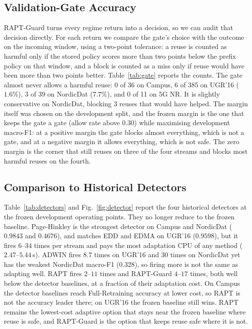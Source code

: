 \subsection{Validation-Gate Accuracy}
\label{sec:guard}
RAPT-Guard turns every regime return into a decision, so we can audit that decision
directly. For each return we compare the gate's choice with the outcome on the incoming
window, using a two-point tolerance: a reuse is counted as harmful only if the stored
policy scores more than two points below the prefix policy on that window, and a block is
counted as a miss only if reuse would have been more than two points better. Table~\ref{tab:gate}
reports the counts. The gate almost never allows a harmful reuse: 0 of 36 on Campus, 6 of
385 on UGR'16 ($1.6\%$), 3 of 39 on NordicDat ($7.7\%$), and 0 of 11 on 5G NR. It is
slightly conservative on NordicDat, blocking 3 reuses that would have helped. The margin
itself was chosen on the development split, and the frozen margin is the one that keeps
the gate a gate (allow rate above $0.30$) while maximising development macro-F1: at a
positive margin the gate blocks almost everything, which is not a gate, and at a negative
margin it allows everything, which is not safe. The zero margin is the corner that still
reuses on three of the four streams and blocks most harmful reuses on the fourth.




\subsection{Comparison to Historical Detectors}
\label{sec:detectors}
Table~\ref{tab:detectors} and Fig.~\ref{fig:detector} report the four historical
detectors at the frozen development operating points. They no longer reduce to the frozen
baseline. Page-Hinkley is the strongest detector on Campus and NordicDat ($0.9843$ and
$0.4676$), and matches EDD and EDMA on UGR'16 ($0.9598$), but it fires $6$--$34$ times per
stream and pays the most adaptation CPU of any method ($2.47$--$5.44$\,s). ADWIN fires
$8.7$ times on UGR'16 and $30$ times on NordicDat yet has the weakest NordicDat macro-F1
($0.328$), so firing more is not the same as adapting well. RAPT fires $2$--$11$ times and
RAPT-Guard $4$--$17$ times, both well below the detector baselines, at a fraction of their
adaptation cost. On Campus the detector baselines reach Full-Retraining accuracy at lower
cost, so RAPT is not the accuracy leader there; on UGR'16 the frozen baseline still wins.
RAPT remains the lowest-cost adaptive option that stays near the frozen baseline where
reuse is safe, and RAPT-Guard is the option that keeps reuse safe where it is not.

